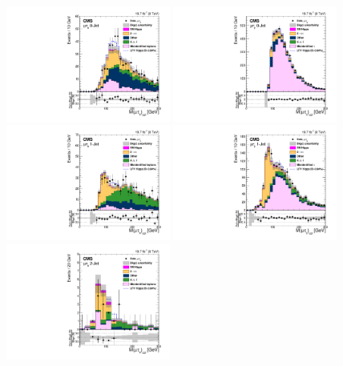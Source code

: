 \begin{figure}[hbtp]\centering
 \includegraphics[width=0.48\textwidth]{muele_GG_m_colinear_UNBLIND_PostFit.pdf}
 \includegraphics[width=0.48\textwidth]{muhad_GG_m_colinear_UNBLIND_PostFit.pdf}
 \includegraphics[width=0.48\textwidth]{muele_Boost_m_colinear_UNBLIND_PostFit.pdf}
 \includegraphics[width=0.48\textwidth]{muhad_Boost_m_colinear_UNBLIND_PostFit.pdf}
 \includegraphics[width=0.48\textwidth]{muele_VBF_m_colinear_UNBLIND_PostFit.pdf}

\end{figure}
